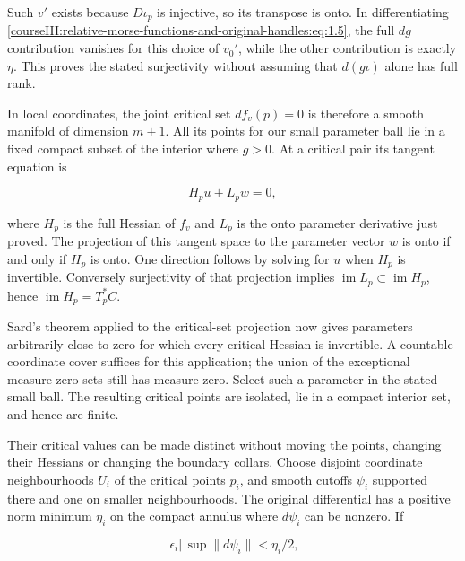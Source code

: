 Such \(v'\) exists because \(D\iota_p\) is injective, so its transpose is onto. In differentiating \eqref{courseIII:relative-morse-functions-and-original-handles:eq:1.5}, the full \(dg\) contribution vanishes for this choice of \(v_0'\), while the other contribution is exactly \(\eta\). This proves the stated surjectivity without assuming that \(d(g\iota)\) alone has full rank.

In local coordinates, the joint critical set \(df_v(p)=0\) is therefore a smooth manifold of dimension \(m+1\). All its points for our small parameter ball lie in a fixed compact subset of the interior where \(g>0\). At a critical pair its tangent equation is

\begin{equation}
H_pu+L_pw=0,
\label{courseIII:relative-morse-functions-and-original-handles:eq:1.7}
\end{equation}

where \(H_p\) is the full Hessian of \(f_v\) and \(L_p\) is the onto parameter derivative just proved. The projection of this tangent space to the parameter vector \(w\) is onto if and only if \(H_p\) is onto. One direction follows by solving for \(u\) when \(H_p\) is invertible. Conversely surjectivity of that projection implies \(\operatorname{im}L_p\subset\operatorname{im}H_p\), hence \(\operatorname{im}H_p=T_p^*C\).

Sard's theorem applied to the critical-set projection now gives parameters arbitrarily close to zero for which every critical Hessian is invertible. A countable coordinate cover suffices for this application; the union of the exceptional measure-zero sets still has measure zero. Select such a parameter in the stated small ball. The resulting critical points are isolated, lie in a compact interior set, and hence are finite.

Their critical values can be made distinct without moving the points, changing their Hessians or changing the boundary collars. Choose disjoint coordinate neighbourhoods \(U_i\) of the critical points \(p_i\), and smooth cutoffs \(\psi_i\) supported there and one on smaller neighbourhoods. The original differential has a positive norm minimum \(\eta_i\) on the compact annulus where \(d\psi_i\) can be nonzero. If

\begin{equation}
|\epsilon_i|\,\sup\|d\psi_i\|<\eta_i/2,
\label{courseIII:relative-morse-functions-and-original-handles:eq:1.8}
\end{equation}

